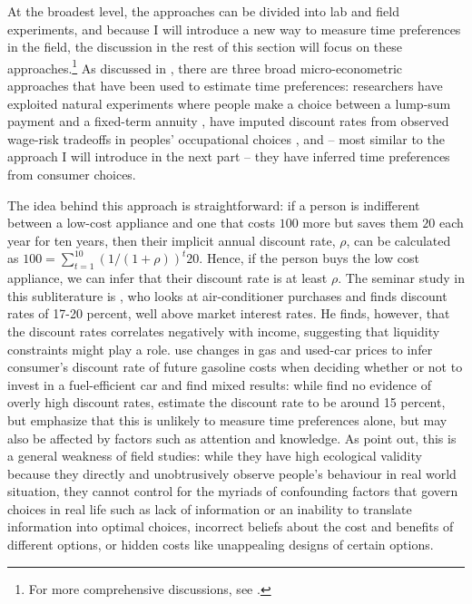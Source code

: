 \documentclass[a4paper, 11pt]{report}
\begin{document}
At the broadest level, the approaches can be divided into lab and field experiments, and because I will introduce a new way to measure time preferences in the field, the discussion in the rest of this section will focus on these approaches.\footnote{For more comprehensive discussions, see \citet{frederick2002time,cohen2020measuring}.} As discussed in \citet{frederick2002time,cohen2020measuring}, there are three broad micro-econometric approaches that have been used to estimate time preferences: researchers have exploited natural experiments where people make a choice between a lump-sum payment and a fixed-term annuity \citep{warner2001personal}, have imputed discount rates from observed wage-risk tradeoffs in peoples' occupational choices \citet{moore1990models}, and -- most similar to the approach I will introduce in the next part -- they have inferred time preferences from consumer choices.

The idea behind this approach is straightforward: if a person is indifferent between a low-cost appliance and one that costs $100$ more but saves them $20$ each year for ten years, then their implicit annual discount rate, $\rho$, can be calculated as $100 = \sum^{10}_{t=1} (1 / (1 + \rho))^{t}20$. Hence, if the person buys the low cost appliance, we can infer that their discount rate is at least $\rho$. The seminar study in this subliterature is \citet{hausman1979individual}, who looks at air-conditioner purchases and finds discount rates of 17-20 percent, well above market interest rates. He finds, however, that the discount rates correlates negatively with income, suggesting that liquidity constraints might play a role. \citet{busse2013consumers,allcott2014gasoline} use changes in gas and used-car prices to infer consumer's discount rate of future gasoline costs when deciding whether or not to invest in a fuel-efficient car and find mixed results: while \citet{busse2013consumers} find no evidence of overly high discount rates, \citet{allcott2014gasoline} estimate the discount rate to be around 15 percent, but emphasize that this is unlikely to measure time preferences alone, but may also be affected by factors such as attention and knowledge. As \citet{frederick2002time} point out, this is a general weakness of field studies: while they have high ecological validity because they directly and unobtrusively observe people's behaviour in real world situation, they cannot control for the myriads of confounding factors that govern choices in real life such as lack of information or an inability to translate information into optimal choices, incorrect beliefs about the cost and benefits of different options, or hidden costs like unappealing designs of certain options.
\end{document}
